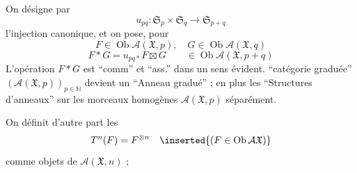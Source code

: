 On désigne par
\[
u_{pq}:\mathfrak S_p\times\mathfrak S_q\longrightarrow\mathfrak S_{p+q}
\]
l'injection canonique, et on pose, pour
\[
F\in\operatorname{Ob}\mathcal A(\mathfrak X,p),\quad G\in\operatorname{Ob}\mathcal A(\mathfrak X,q)
\]
\[
F*G=u_{pq*}F\boxtimes G\qquad\in\operatorname{Ob}\mathcal A(\mathfrak X,p+q)
\]
L'opération $F*G$ est ``comm'' et ``ass.'' dans un sens évident.   ``catégorie graduée'' $(\mathcal A(\mathfrak X,p))_{p\in\mathbb N}$ devient un ``Anneau gradué'' ; en plus les ``Structures d'anneaux'' sur les morceaux homogènes $\mathcal A(\mathfrak X,p)$ séparément.

On définit d'autre part les
\[
T^n(F)=F^{\otimes n}\quad\inserted{(F\in\operatorname{Ob}\mathcal A\mathfrak X)}
\]
comme objets de $\mathcal A(\mathfrak X,n)$ ;
